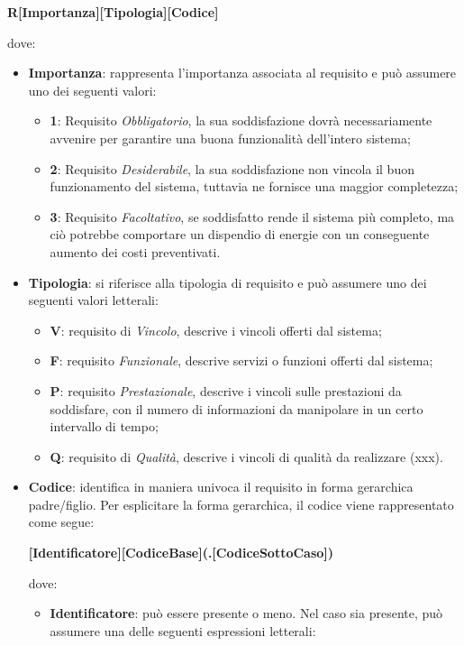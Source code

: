 \begin{center}
\textbf{R[Importanza][Tipologia][Codice]}
\end{center}
dove:
\begin{itemize}
\item \textbf{Importanza}: rappresenta l’importanza associata al requisito e può assumere uno dei seguenti valori:
\begin{itemize}
	\item \textbf{1}: Requisito \textit{Obbligatorio}, la sua soddisfazione dovrà necessariamente avvenire per garantire una buona funzionalità dell’intero sistema;
	\item \textbf{2}: Requisito \textit{Desiderabile}, la sua soddisfazione non vincola il buon funzionamento del sistema, tuttavia ne fornisce una maggior completezza;
	\item \textbf{3}: Requisito \textit{Facoltativo}, se soddisfatto rende il sistema più completo, ma ciò potrebbe comportare un dispendio di energie con un conseguente aumento dei costi preventivati.
\end{itemize}
\item \textbf{Tipologia}: si riferisce alla tipologia di requisito e può assumere uno dei seguenti valori letterali:
\begin{itemize}
	\item \textbf{V}: requisito di \textit{Vincolo}, descrive i vincoli offerti dal sistema;
	\item \textbf{F}: requisito \textit{Funzionale}, descrive servizi o funzioni offerti dal sistema;
	\item \textbf{P}: requisito \textit{Prestazionale}, descrive i vincoli sulle prestazioni da soddisfare, con il numero di informazioni da manipolare in un certo intervallo di tempo;
	\item \textbf{Q}: requisito di \textit{Qualità}, descrive i vincoli di qualità da realizzare (xxx).
\end{itemize}
\item \textbf{Codice}: identifica in maniera univoca il requisito in forma gerarchica padre/figlio.
Per esplicitare la forma gerarchica, il codice viene rappresentato come segue:
\begin{center}
\textbf{[Identificatore][CodiceBase](.[CodiceSottoCaso])}
\end{center}
dove: 
\begin{itemize}
	\item \textbf{Identificatore}: può essere presente o meno. Nel caso sia presente, può assumere una delle seguenti espressioni letterali:

\end{itemize}
\end{itemize}
